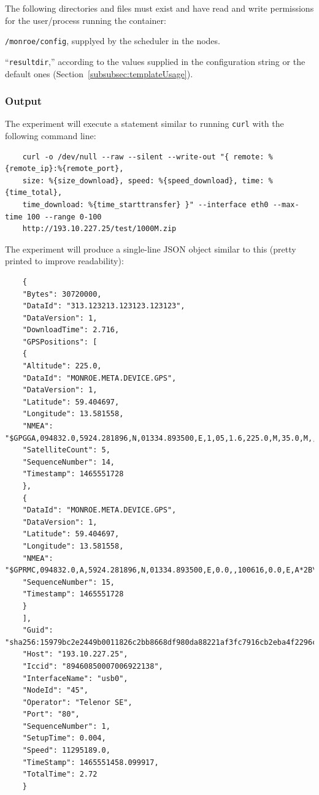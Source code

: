 \documentclass[a4paper,10pt]{article}
\newcommand{\VerbatimFont}{\footnotesize}
\newcommand{\identifier}[1]{{\texttt{\small{#1}}}}
\begin{document}
The following directories and files must exist and have read and write permissions for the user/process running the container:

\begin{itemize*}
	\item \identifier{/monroe/config}, supplyed by the scheduler in the nodes.
	\item ``\identifier{resultdir},'' according to the values supplied in the configuration string or the default ones (Section~\ref{subsubsec:templateUsage}).
\end{itemize*}

\subsubsection{Output}

The experiment will execute a statement similar to running \identifier{curl} with the following command line:

{\VerbatimFont
	\begin{verbatim}
	curl -o /dev/null --raw --silent --write-out "{ remote: %{remote_ip}:%{remote_port},
	size: %{size_download}, speed: %{speed_download}, time: %{time_total},
	time_download: %{time_starttransfer} }" --interface eth0 --max-time 100 --range 0-100
	http://193.10.227.25/test/1000M.zip
	\end{verbatim}}

The experiment will produce a single-line JSON object similar to this (pretty printed to improve readability):

{\VerbatimFont
	\begin{verbatim}
	{
	"Bytes": 30720000,
	"DataId": "313.123213.123123.123123",
	"DataVersion": 1,
	"DownloadTime": 2.716,
	"GPSPositions": [
	{
	"Altitude": 225.0,
	"DataId": "MONROE.META.DEVICE.GPS",
	"DataVersion": 1,
	"Latitude": 59.404697,
	"Longitude": 13.581558,
	"NMEA": "$GPGGA,094832.0,5924.281896,N,01334.893500,E,1,05,1.6,225.0,M,35.0,M,,*5D\r\n",
	"SatelliteCount": 5,
	"SequenceNumber": 14,
	"Timestamp": 1465551728
	},
	{
	"DataId": "MONROE.META.DEVICE.GPS",
	"DataVersion": 1,
	"Latitude": 59.404697,
	"Longitude": 13.581558,
	"NMEA": "$GPRMC,094832.0,A,5924.281896,N,01334.893500,E,0.0,,100616,0.0,E,A*2B\r\n",
	"SequenceNumber": 15,
	"Timestamp": 1465551728
	}
	],
	"Guid": "sha256:15979bc2e2449b0011826c2bb8668df980da88221af3fc7916cb2eba4f2296c1.0.45.15",
	"Host": "193.10.227.25",
	"Iccid": "89460850007006922138",
	"InterfaceName": "usb0",
	"NodeId": "45",
	"Operator": "Telenor SE",
	"Port": "80",
	"SequenceNumber": 1,
	"SetupTime": 0.004,
	"Speed": 11295189.0,
	"TimeStamp": 1465551458.099917,
	"TotalTime": 2.72
	}
	\end{verbatim}}
\end{document}
